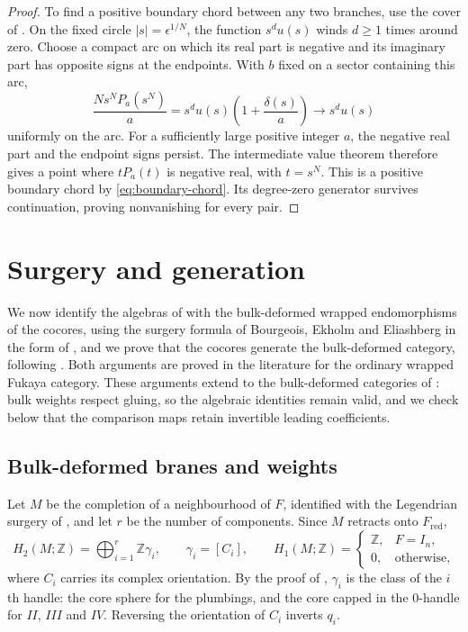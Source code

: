 \documentclass[a4paper]{amsart}
\newcommand{\ZZ}{\mathbb{Z}}
\numberwithin{equation}{section}
\begin{document}
\begin{proof}
To find a positive boundary chord between any two branches, use the
cover of . On the fixed circle
$|s|=\epsilon^{1/N}$, the function $s^du(s)$ winds $d\geq1$ times
around zero. Choose a compact arc on which its real part is negative
and its imaginary part has opposite signs at the endpoints. With $b$
fixed on a sector containing this arc,
\[
 \frac{Ns^NP_a(s^N)}a
 =s^du(s)\left(1+\frac{\delta(s)}a\right)
 \longrightarrow s^du(s)
\]
uniformly on the arc. For a sufficiently large positive integer $a$,
the negative real part and the endpoint signs persist. The intermediate
value theorem therefore gives a point where $tP_a(t)$ is negative real,
with $t=s^N$. This is a positive boundary chord by
\eqref{eq:boundary-chord}. Its degree-zero generator survives
continuation, proving nonvanishing for every pair.
\end{proof}

\section{Surgery and generation}
\label{sec:surgery}

We now identify the algebras of  with the
bulk-deformed wrapped endomorphisms of the cocores, using the surgery
formula of Bourgeois, Ekholm and Eliashberg \cite{BEE} in the form of
\cite{ELduality}, and we prove that the cocores generate the
bulk-deformed category, following \cite{CDRGG}. Both arguments are
proved in the literature for the ordinary wrapped Fukaya category.
These arguments extend to the bulk-deformed categories of
: bulk weights respect gluing, so the algebraic
identities remain valid, and we check below that the comparison maps
retain invertible leading coefficients.

\subsection{Bulk-deformed branes and weights}
\label{subsec:bulk-data}

Let $M$ be the completion of a neighbourhood of $F$, identified with the
Legendrian surgery of , and let $r$ be
the number of components. Since $M$ retracts onto $F_{\mathrm{red}}$,
\[
 H_2(M;\ZZ)=\bigoplus_{i=1}^r\ZZ\gamma_i,\qquad \gamma_i=[C_i],
 \qquad
 H_1(M;\ZZ)=
 \begin{cases}\ZZ,&F=I_n,\\0,&\text{otherwise},\end{cases}
\]
where $C_i$ carries its complex orientation. By the proof of
, $\gamma_i$ is the class of the $i$th
handle: the core sphere for the plumbings, and the core capped in the
$0$-handle for $II$, $III$ and $IV$. Reversing the orientation of $C_i$
inverts $q_i$.
\end{document}
